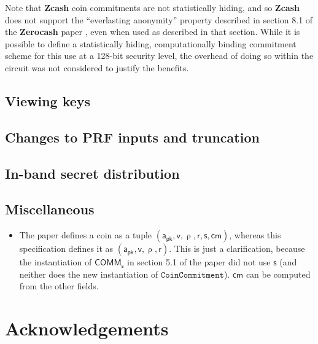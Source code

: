 \documentclass{article}
\newcommand{\todo}[1]{{\color{Sepia}\sf{TODO: #1}}}
\newcommand{\termbf}[1]{\textbf{#1}\xspace}
\newcommand{\Zcash}{\termbf{Zcash}}
\newcommand{\Zerocash}{\termbf{Zerocash}}
\newcommand{\AuthPublic}{\mathsf{a_{pk}}}
\newcommand{\Value}{\mathsf{v}}
\newcommand{\CoinCommitRand}{\mathsf{r}}
\newcommand{\CoinAddressRand}{\mathsf{\uprho}}
\newcommand{\CoinCommitS}{\mathsf{s}}
\newcommand{\CRH}{\mathsf{CRH}}
\newcommand{\cm}{\mathsf{cm}}
\newcommand{\COMM}[1]{\mathsf{COMM}_{#1}}
\newcommand{\CoinCommitment}{\mathtt{CoinCommitment}}
\begin{document}
Note that \Zcash coin commitments are not statistically hiding, and
so \Zcash does not support the ``everlasting anonymity'' property
described in section 8.1 of the \Zerocash paper \cite{ZerocashOakland},
even when used as described in that section. While it is possible to
define a statistically hiding, computationally binding commitment scheme
for this use at a 128-bit security level, the overhead of doing so
within the circuit was not considered to justify the benefits.

\subsection{Viewing keys}

\todo{}

\subsection{Changes to PRF inputs and truncation}

\todo{}


\subsection{In-band secret distribution}

\todo{}

\subsection{Miscellaneous}

\begin{itemize}
    \item The paper defines a coin as a tuple $(\AuthPublic, \Value,
\CoinAddressRand, \CoinCommitRand, \CoinCommitS, \cm)$, whereas this specification
defines it as $(\AuthPublic, \Value, \CoinAddressRand, \CoinCommitRand)$.
This is just a clarification, because the instantiation of $\COMM{\CoinCommitS}$
in section 5.1 of the paper did not use $\CoinCommitS$ (and neither does the
new instantiation of $\CoinCommitment$). $\cm$ can be computed from the other
fields.
\end{itemize}


\section{Acknowledgements}
\end{document}
